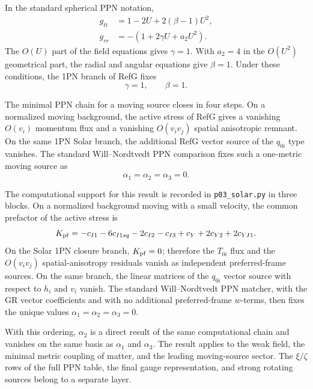 \documentclass[12pt]{article}
\begin{document}
In the standard spherical PPN notation,
\begin{align}
g_{tt} &= 1-2U+2(\beta-1)U^2, \\
g_{rr} &= -\left(1+2\gamma U+a_2U^2\right).
\end{align}
The $O(U)$ part of the field equations gives $\gamma=1$. With $a_2=4$ in the $O(U^2)$ geometrical part, the radial and angular equations give $\beta=1$. Under these conditions, the 1PN branch of RefG fixes
\begin{equation}
\gamma=1,\qquad \beta=1 .
\end{equation}

The minimal PPN chain for a moving source closes in four steps. On a normalized moving background, the active stress of RefG gives a vanishing $O(v_i)$ momentum flux and a vanishing $O(v_iv_j)$ spatial anisotropic remnant. On the same 1PN Solar branch, the additional RefG vector source of the $q_{0i}$ type vanishes. The standard Will--Nordtvedt PPN comparison fixes such a one-metric moving source as
\begin{equation}
\alpha_1=\alpha_2=\alpha_3=0 .
\end{equation}

The computational support for this result is recorded in \texttt{p03\_solar.py} in three blocks. On a normalized background moving with a small velocity, the common prefactor of the active stress is
\begin{equation}
K_{\rm pf}=-c_{I1}-6c_{I1sq}-2c_{I2}-c_{I3}
+c_Y+2c_{Y2}+2c_{YI1}.
\end{equation}
On the Solar 1PN closure branch, $K_{\rm pf}=0$; therefore the $T_{0i}$ flux and the $O(v_i v_j)$ spatial-anisotropy residuals vanish as independent preferred-frame sources. On the same branch, the linear matrices of the $q_{0i}$ vector source with respect to $h_i$ and $v_i$ vanish. The standard Will--Nordtvedt PPN matcher, with the GR vector coefficients and with no additional preferred-frame $w$-terms, then fixes the unique values $\alpha_1=\alpha_2=\alpha_3=0$.

With this ordering, $\alpha_2$ is a direct result of the same computational chain and vanishes on the same basis as $\alpha_1$ and $\alpha_3$. The result applies to the weak field, the minimal metric coupling of matter, and the leading moving-source sector. The $\xi/\zeta$ rows of the full PPN table, the final gauge representation, and strong rotating sources belong to a separate layer.
\end{document}

